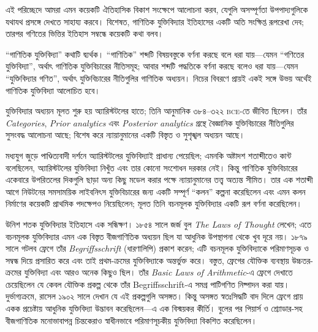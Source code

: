 \documentclass[../../../include/open-logic-section]{subfiles}
\begin{document}


এই পরিচ্ছেদে আমরা এমন কয়েকটি ঐতিহাসিক বিকাশ সংক্ষেপে আলোচনা করব, যেগুলি
অসম্পূর্ণতা উপপাদ্যগুলিকে যথাযথ প্রসঙ্গে দেখতে সাহায্য করবে। বিশেষত,
গাণিতিক যুক্তিবিদ্যার ইতিহাসের একটি অতি সংক্ষিপ্ত রূপরেখা দেব; তারপর
গণিতের ভিত্তির ইতিহাস সম্বন্ধে কয়েকটি কথা বলব।

\begin{digress}
  ``গাণিতিক যুক্তিবিদ্যা'' কথাটি দ্ব্যর্থক। ``গাণিতিক'' শব্দটি বিষয়বস্তুকে
  বর্ণনা করছে বলে ধরা যায়—যেমন ``গণিতের যুক্তিবিদ্যা'', অর্থাৎ গাণিতিক
  যুক্তিবিচারের নীতিসমূহ; আবার শব্দটি পদ্ধতিকে বর্ণনা করছে বলেও ধরা যায়—যেমন
  ``যুক্তিবিদ্যার গণিত'', অর্থাৎ যুক্তিবিচারের নীতিগুলির গাণিতিক অধ্যয়ন। নিচের
  বিবরণে প্রায়ই একই সঙ্গে উভয় অর্থেই গাণিতিক যুক্তিবিদ্যা আলোচিত হবে।
\end{digress}

যুক্তিবিদ্যার অধ্যয়ন মূলত শুরু হয় অ্যারিস্টটলের হাতে; তিনি আনুমানিক
৩৮৪--৩২২ \textsc{bce}-তে জীবিত ছিলেন। তাঁর \emph{Categories}, \emph{Prior
  analytics} এবং \emph{Posterior analytics} গ্রন্থে বৈজ্ঞানিক যুক্তিবিচারের
নীতিগুলির সুসংবদ্ধ আলোচনা আছে; বিশেষ করে ন্যায়ানুমানের একটি বিস্তৃত ও
সুশৃঙ্খল অধ্যয়ন আছে।

মধ্যযুগ জুড়ে পাণ্ডিত্যবাদী দর্শনে অ্যারিস্টটলের যুক্তিবিদ্যাই প্রাধান্য
পেয়েছিল; এমনকি অষ্টাদশ শতাব্দীতেও কান্ট বলেছিলেন, অ্যারিস্টটলের যুক্তিবিদ্যা
নিখুঁত এবং তার কোনো সংশোধন দরকার নেই। কিন্তু গাণিতিক যুক্তিবিচারের একেবারে
উপরিতলের দিকগুলি ছাড়া অন্য কিছু মডেল করার পক্ষে ন্যায়ানুমানের তত্ত্ব অত্যন্ত
সীমিত। তার এক শতাব্দী আগে নিউটনের সমসাময়িক লাইবনিৎস যুক্তিবিচারের জন্য একটি
সম্পূর্ণ ``কলন'' কল্পনা করেছিলেন এবং এমন কলন নির্মাণের কয়েকটি প্রাথমিক পদক্ষেপও
নিয়েছিলেন; মূলত তিনি বচনমূলক যুক্তিবিদ্যার একটি রূপ বর্ণনা করেছিলেন।

উনিশ শতক যুক্তিবিদ্যার ইতিহাসে এক সন্ধিক্ষণ। ১৮৫৪ সালে জর্জ বুল
\emph{The Laws of Thought} লেখেন; এতে বচনমূলক যুক্তিবিদ্যার এমন এক বিস্তৃত
বীজগাণিতিক অধ্যয়ন ছিল যা আধুনিক উপস্থাপনা থেকে খুব দূরে নয়। ১৮৭৯ সালে
গটলব ফ্রেগে তাঁর \emph{Begriffsschrift} (ধারণালিপি) প্রকাশ করেন; এটি
বচনমূলক যুক্তিবিদ্যাকে পরিমাণসূচক ও সম্বন্ধ দিয়ে প্রসারিত করে এবং তাই
প্রথম-ক্রমের যুক্তিবিদ্যাকে অন্তর্ভুক্ত করে। বস্তুত, ফ্রেগের যৌক্তিক ব্যবস্থায়
উচ্চতর-ক্রমের যুক্তিবিদ্যা এবং আরও অনেক কিছুও ছিল। তাঁর \emph{Basic Laws
  of Arithmetic}-এ ফ্রেগে দেখাতে চেয়েছিলেন যে কেবল যৌক্তিক প্রকল্প থেকে তাঁর
Begriffsschrift-এ সমগ্র পাটিগণিত নিষ্পাদন করা যায়। দুর্ভাগ্যক্রমে, রাসেল
১৯০২ সালে দেখান যে এই প্রকল্পগুলি অসঙ্গত। কিন্তু অসঙ্গত স্বতঃসিদ্ধটি বাদ দিলে
ফ্রেগে প্রায় একক প্রচেষ্টায় আধুনিক যুক্তিবিদ্যা উদ্ভাবন করেছিলেন—এ এক বিস্ময়কর
কীর্তি। বুলের পর পিয়ার্স ও শ্র্যোডার-সহ বীজগাণিতিক মনোভাবাপন্ন চিন্তকেরাও
স্বাধীনভাবে পরিমাণসূচকীয় যুক্তিবিদ্যা বিকশিত করেছিলেন।
\end{document}
